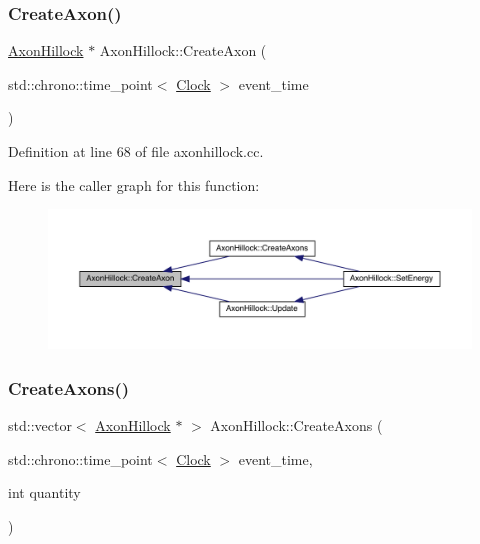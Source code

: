 \subsubsection{\texorpdfstring{Create\+Axon()}{CreateAxon()}}
{\footnotesize\ttfamily \hyperlink{class_axon_hillock}{Axon\+Hillock} $\ast$ Axon\+Hillock\+::\+Create\+Axon (\begin{DoxyParamCaption}\item[{std\+::chrono\+::time\+\_\+point$<$ \hyperlink{universe_8h_a0ef8d951d1ca5ab3cfaf7ab4c7a6fd80}{Clock} $>$}]{event\+\_\+time }\end{DoxyParamCaption})}



Definition at line 68 of file axonhillock.\+cc.

Here is the caller graph for this function\+:
\nopagebreak
\begin{figure}[H]
\begin{center}
\leavevmode
\includegraphics[width=350pt]{class_axon_hillock_ae6b18ec6f2921b9d4461b89a9d72ab25_icgraph}
\end{center}
\end{figure}
\mbox{\label{class_axon_hillock_a15bf1a433f38b8b0c92e4a4efe22ec6f}} 
\subsubsection{\texorpdfstring{Create\+Axons()}{CreateAxons()}}
{\footnotesize\ttfamily std\+::vector$<$ \hyperlink{class_axon_hillock}{Axon\+Hillock} $\ast$ $>$ Axon\+Hillock\+::\+Create\+Axons (\begin{DoxyParamCaption}\item[{std\+::chrono\+::time\+\_\+point$<$ \hyperlink{universe_8h_a0ef8d951d1ca5ab3cfaf7ab4c7a6fd80}{Clock} $>$}]{event\+\_\+time,  }\item[{int}]{quantity }\end{DoxyParamCaption})}



